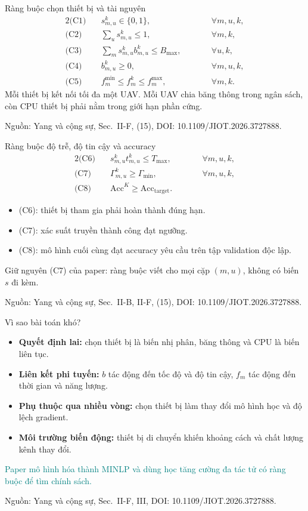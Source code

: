 \documentclass[aspectratio=169,11pt]{beamer}
\newcommand{\source}[1]{\par\vfill{\tiny\color{Muted}Nguồn: #1\par}}
\newcommand{\paperref}[1]{\source{Yang và cộng sự, Sec.~#1, DOI: 10.1109/JIOT.2026.3727888.}}
\newcommand{\Acc}{\mathrm{Acc}}
\begin{document}
\begin{frame}{Ràng buộc chọn thiết bị và tài nguyên}
  \begin{alignat*}{2}
    \text{(C1)}\quad &s_{m,u}^k\in\{0,1\},
      &\qquad&\forall m,u,k,\\[0.35em]
    \text{(C2)}\quad &\sum_u s_{m,u}^k\leq1,
      &&\forall m,k,\\[0.35em]
    \text{(C3)}\quad &\sum_m s_{m,u}^k b_{m,u}^k\leq B_{\max},
      &&\forall u,k,\\[0.35em]
    \text{(C4)}\quad &b_{m,u}^k\geq0,
      &&\forall m,u,k,\\[0.35em]
    \text{(C5)}\quad &f_m^{\min}\leq f_m^k\leq f_m^{\max},
      &&\forall m,k.
  \end{alignat*}
  Mỗi thiết bị kết nối tối đa một UAV. Mỗi UAV chia băng thông trong ngân sách, còn CPU thiết bị phải nằm trong giới hạn phần cứng.
  \paperref{II-F, (15)}
\end{frame}

\begin{frame}{Ràng buộc độ trễ, độ tin cậy và accuracy}
  \begin{alignat*}{2}
    \text{(C6)}\quad &s_{m,u}^k t_{m,u}^k\leq T_{\max},
      &\qquad&\forall m,u,k,\\[0.7em]
    \text{(C7)}\quad &\Gamma_{m,u}^k\geq\Gamma_{\min},
      &&\forall m,u,k,\\[0.7em]
    \text{(C8)}\quad &\Acc^K\geq\Acc_{\mathrm{target}}.&&
  \end{alignat*}
  \begin{itemize}
    \item (C6): thiết bị tham gia phải hoàn thành đúng hạn.
    \item (C7): xác suất truyền thành công đạt ngưỡng.
    \item (C8): mô hình cuối cùng đạt accuracy yêu cầu trên tập validation độc lập.
  \end{itemize}
  {\footnotesize Giữ nguyên (C7) của paper: ràng buộc viết cho mọi cặp $(m,u)$, không có biến $s$ đi kèm.}
  \paperref{II-B, II-F, (15)}
\end{frame}

\begin{frame}{Vì sao bài toán khó?}
  \begin{itemize}
    \setlength{\itemsep}{0.8em}
    \item \textbf{Quyết định lai:} chọn thiết bị là biến nhị phân, băng thông và CPU là biến liên tục.
    \item \textbf{Liên kết phi tuyến:} $b$ tác động đến tốc độ và độ tin cậy, $f_m$ tác động đến thời gian và năng lượng.
    \item \textbf{Phụ thuộc qua nhiều vòng:} chọn thiết bị làm thay đổi mô hình học và độ lệch gradient.
    \item \textbf{Môi trường biến động:} thiết bị di chuyển khiến khoảng cách và chất lượng kênh thay đổi.
  \end{itemize}
  \vspace{0.25cm}
  \textcolor{Teal}{Paper mô hình hóa thành MINLP và dùng học tăng cường đa tác tử có ràng buộc để tìm chính sách.}
  \paperref{II-F, III}
\end{frame}
\end{document}
